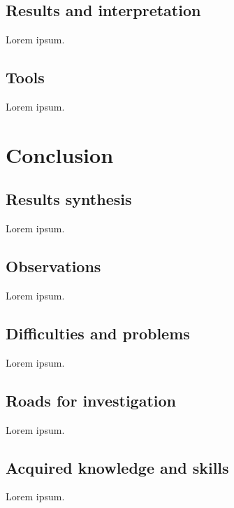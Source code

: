\documentclass[12pt, a4paper]{report}
\begin{document}
		\section{Results and interpretation}
			Lorem ipsum.
		\section{Tools}
			Lorem ipsum.
	\chapter{Conclusion}
		\section{Results synthesis}
			Lorem ipsum.
		\section{Observations}
			Lorem ipsum.
		\section{Difficulties and problems}
			Lorem ipsum.
		\section{Roads for investigation}
			Lorem ipsum.
		\section{Acquired knowledge and skills}
			Lorem ipsum.
	
	
	\appendix
\end{document}
